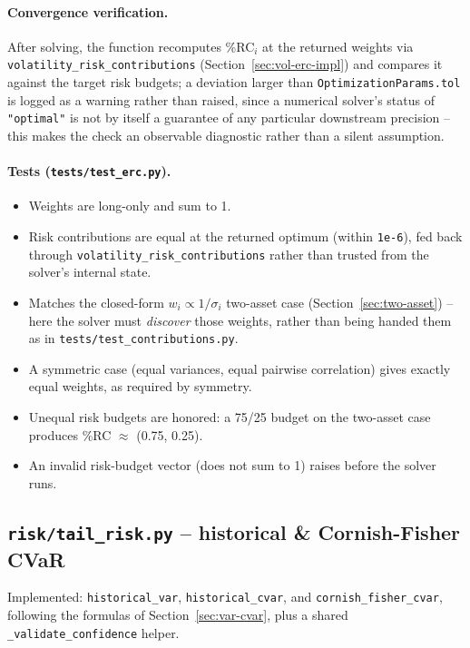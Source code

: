\documentclass[11pt]{article}
\begin{document}
\paragraph{Convergence verification.} After solving, the function
recomputes \%RC$_i$ at the returned weights via
\texttt{volatility\_risk\_contributions} (Section~\ref{sec:vol-erc-impl})
and compares it against the target risk budgets; a deviation larger than
\texttt{OptimizationParams.tol} is logged as a warning rather than
raised, since a numerical solver's status of \texttt{"optimal"} is not by
itself a guarantee of any particular downstream precision -- this makes
the check an observable diagnostic rather than a silent assumption.

\paragraph{Tests (\texttt{tests/test\_erc.py}).}
\begin{itemize}
    \item Weights are long-only and sum to 1.
    \item Risk contributions are equal at the returned optimum (within
    \texttt{1e-6}), fed back through
    \texttt{volatility\_risk\_contributions} rather than trusted from the
    solver's internal state.
    \item Matches the closed-form $w_i \propto 1/\sigma_i$ two-asset case
    (Section~\ref{sec:two-asset}) -- here the solver must \emph{discover}
    those weights, rather than being handed them as in
    \texttt{tests/test\_contributions.py}.
    \item A symmetric case (equal variances, equal pairwise correlation)
    gives exactly equal weights, as required by symmetry.
    \item Unequal risk budgets are honored: a 75/25 budget on the
    two-asset case produces \%RC $\approx$ (0.75, 0.25).
    \item An invalid risk-budget vector (does not sum to 1) raises
    before the solver runs.
\end{itemize}

\subsection{\texttt{risk/tail\_risk.py} -- historical \& Cornish-Fisher CVaR}
\label{sec:tail-risk-impl}

Implemented: \texttt{historical\_var}, \texttt{historical\_cvar}, and
\texttt{cornish\_fisher\_cvar}, following the formulas of
Section~\ref{sec:var-cvar}, plus a shared \texttt{\_validate\_confidence}
helper.
\end{document}
